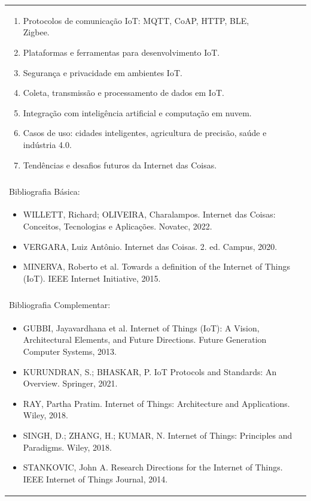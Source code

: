 \documentclass[11pt]{article}
\begin{document}
\begin{center}
\begin{longtable}{|p{4cm}|p{4cm}|p{4cm}|p{4cm}|}
{\begin{enumerate}
\item Protocolos de comunicação IoT: MQTT, CoAP, HTTP, BLE, Zigbee.
\item Plataformas e ferramentas para desenvolvimento IoT.
\item Segurança e privacidade em ambientes IoT.
\item Coleta, transmissão e processamento de dados em IoT.
\item Integração com inteligência artificial e computação em nuvem.
\item Casos de uso: cidades inteligentes, agricultura de precisão, saúde e indústria 4.0.
\item Tendências e desafios futuros da Internet das Coisas.\end{enumerate}}\\
\multicolumn{4}{|p{16cm}|}{}\\
\hline
\multicolumn{4}{|p{16cm}|}{Bibliografia Básica:}\\
\multicolumn{4}{|p{\dimexpr 16cm + 6\tabcolsep\relax}|}{%
\begin{itemize}\item WILLETT, Richard; OLIVEIRA, Charalampos. Internet das Coisas: Conceitos, Tecnologias e Aplicações. Novatec, 2022.
\item VERGARA, Luiz Antônio. Internet das Coisas. 2. ed. Campus, 2020.
\item MINERVA, Roberto et al. Towards a definition of the Internet of Things (IoT). IEEE Internet Initiative, 2015.\end{itemize}}\\
\multicolumn{4}{|p{16cm}|}{}\\
\hline
\multicolumn{4}{|p{16cm}|}{Bibliografia Complementar:}\\
\multicolumn{4}{|p{\dimexpr 16cm + 6\tabcolsep\relax}|}{%
\begin{itemize}\item GUBBI, Jayavardhana et al. Internet of Things (IoT): A Vision, Architectural Elements, and Future Directions. Future Generation Computer Systems, 2013.
\item KURUNDRAN, S.; BHASKAR, P. IoT Protocols and Standards: An Overview. Springer, 2021.
\item RAY, Partha Pratim. Internet of Things: Architecture and Applications. Wiley, 2018.
\item SINGH, D.; ZHANG, H.; KUMAR, N. Internet of Things: Principles and Paradigms. Wiley, 2018.
\item STANKOVIC, John A. Research Directions for the Internet of Things. IEEE Internet of Things Journal, 2014.\end{itemize}}\\
\hline
\end{longtable}
\end{center}
\end{document}
